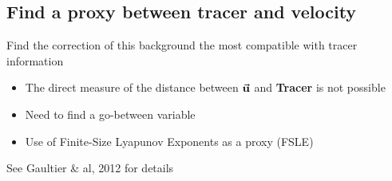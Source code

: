 \documentclass[compress,slidescentered,notes=show]{beamer}
\begin{document}
	\subsection{Find a proxy between tracer and velocity}
\begin{frame}
  \vspace{0.6cm}
  \begin{block}{Find the correction of this background the most compatible with tracer information}
    \begin{itemize}
     \item The direct measure of the distance between $\vec{\bf{u}}$ and \textbf{Tracer} is not possible
     \item Need to find a go-between variable
     \item Use of Finite-Size Lyapunov Exponents as a proxy (FSLE)
    \end{itemize}
  \end{block}
    \small{See Gaultier \& al, 2012 for details}
\end{frame}

\begin{frame}

\end{frame}
\end{document}

